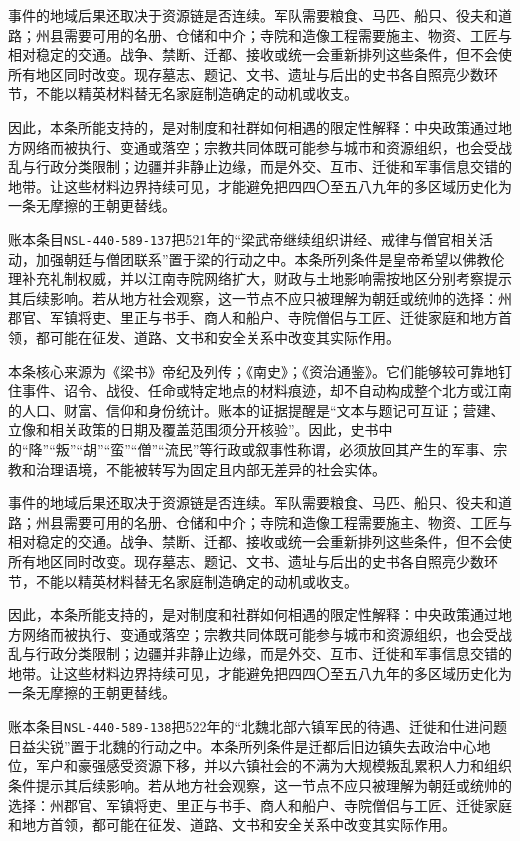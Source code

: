 事件的地域后果还取决于资源链是否连续。军队需要粮食、马匹、船只、役夫和道路；州县需要可用的名册、仓储和中介；寺院和造像工程需要施主、物资、工匠与相对稳定的交通。战争、禁断、迁都、接收或统一会重新排列这些条件，但不会使所有地区同时改变。现存墓志、题记、文书、遗址与后出的史书各自照亮少数环节，不能以精英材料替无名家庭制造确定的动机或收支。

因此，本条所能支持的，是对制度和社群如何相遇的限定性解释：中央政策通过地方网络而被执行、变通或落空；宗教共同体既可能参与城市和资源组织，也会受战乱与行政分类限制；边疆并非静止边缘，而是外交、互市、迁徙和军事信息交错的地带。让这些材料边界持续可见，才能避免把四四〇至五八九年的多区域历史化为一条无摩擦的王朝更替线。

账本条目\texttt{NSL-440-589-137}把521年的“梁武帝继续组织讲经、戒律与僧官相关活动，加强朝廷与僧团联系”置于梁的行动之中。本条所列条件是皇帝希望以佛教伦理补充礼制权威，并以江南寺院网络扩大，财政与土地影响需按地区分别考察提示其后续影响。若从地方社会观察，这一节点不应只被理解为朝廷或统帅的选择：州郡官、军镇将吏、里正与书手、商人和船户、寺院僧侣与工匠、迁徙家庭和地方首领，都可能在征发、道路、文书和安全关系中改变其实际作用。

本条核心来源为《梁书》帝纪及列传；《南史》；《资治通鉴》。它们能够较可靠地钉住事件、诏令、战役、任命或特定地点的材料痕迹，却不自动构成整个北方或江南的人口、财富、信仰和身份统计。账本的证据提醒是“文本与题记可互证；营建、立像和相关政策的日期及覆盖范围须分开核验”。因此，史书中的“降”“叛”“胡”“蛮”“僧”“流民”等行政或叙事性称谓，必须放回其产生的军事、宗教和治理语境，不能被转写为固定且内部无差异的社会实体。

事件的地域后果还取决于资源链是否连续。军队需要粮食、马匹、船只、役夫和道路；州县需要可用的名册、仓储和中介；寺院和造像工程需要施主、物资、工匠与相对稳定的交通。战争、禁断、迁都、接收或统一会重新排列这些条件，但不会使所有地区同时改变。现存墓志、题记、文书、遗址与后出的史书各自照亮少数环节，不能以精英材料替无名家庭制造确定的动机或收支。

因此，本条所能支持的，是对制度和社群如何相遇的限定性解释：中央政策通过地方网络而被执行、变通或落空；宗教共同体既可能参与城市和资源组织，也会受战乱与行政分类限制；边疆并非静止边缘，而是外交、互市、迁徙和军事信息交错的地带。让这些材料边界持续可见，才能避免把四四〇至五八九年的多区域历史化为一条无摩擦的王朝更替线。

账本条目\texttt{NSL-440-589-138}把522年的“北魏北部六镇军民的待遇、迁徙和仕进问题日益尖锐”置于北魏的行动之中。本条所列条件是迁都后旧边镇失去政治中心地位，军户和豪强感受资源下移，并以六镇社会的不满为大规模叛乱累积人力和组织条件提示其后续影响。若从地方社会观察，这一节点不应只被理解为朝廷或统帅的选择：州郡官、军镇将吏、里正与书手、商人和船户、寺院僧侣与工匠、迁徙家庭和地方首领，都可能在征发、道路、文书和安全关系中改变其实际作用。

